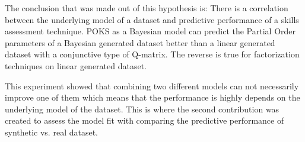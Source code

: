 The conclusion that was made out of this hypothesis is: There is a correlation between the underlying model of a dataset and predictive performance of a skills assessment technique. POKS as a Bayesian model can predict the Partial Order parameters of a Bayesian generated dataset better than a linear generated dataset with a conjunctive type of Q-matrix. The reverse is true for factorization techniques on linear generated dataset. 

This experiment showed that combining two different models can not necessarily improve one of them which means that the performance is highly depends on the underlying model  of the dataset. This is where  the second contribution was created to assess the model fit with comparing the predictive performance of synthetic vs. real dataset.

